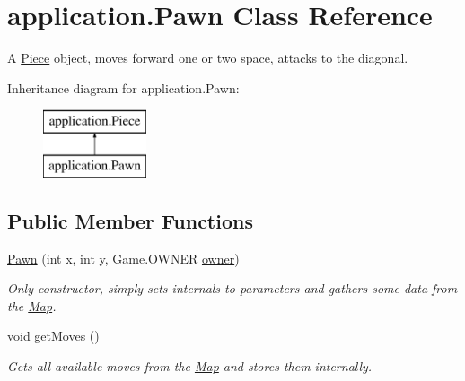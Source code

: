 \hypertarget{classapplication_1_1_pawn}{\section{application.\+Pawn Class Reference}
\label{classapplication_1_1_pawn}
}


A \hyperlink{classapplication_1_1_piece}{Piece} object, moves forward one or two space, attacks to the diagonal.  


Inheritance diagram for application.\+Pawn\+:\begin{figure}[H]
\begin{center}
\leavevmode
\includegraphics[height=2.000000cm]{classapplication_1_1_pawn}
\end{center}
\end{figure}
\subsection*{Public Member Functions}
\begin{DoxyCompactItemize}
\item 
\hyperlink{classapplication_1_1_pawn_aa4d6c3a524dabd13c17a220bfd5db423}{Pawn} (int x, int y, Game.\+O\+W\+N\+E\+R \hyperlink{classapplication_1_1_piece_a724f116bd99a66a6f6bcc8b7b35de131}{owner})
\begin{DoxyCompactList}\small\item\em Only constructor, simply sets internals to parameters and gathers some data from the \hyperlink{classapplication_1_1_map}{Map}. \end{DoxyCompactList}\item 
\hypertarget{classapplication_1_1_pawn_a0a43e16b2e2d80001617aeb0cd0ad440}{void \hyperlink{classapplication_1_1_pawn_a0a43e16b2e2d80001617aeb0cd0ad440}{get\+Moves} ()}\label{classapplication_1_1_pawn_a0a43e16b2e2d80001617aeb0cd0ad440}

\begin{DoxyCompactList}\small\item\em Gets all available moves from the \hyperlink{classapplication_1_1_map}{Map} and stores them internally. \end{DoxyCompactList}\end{DoxyCompactItemize}
